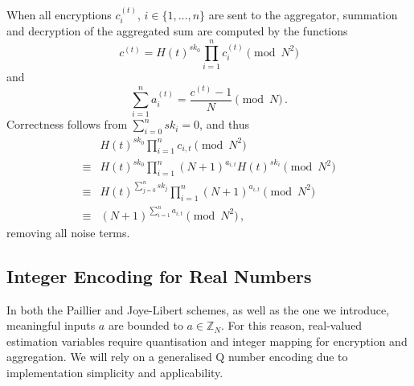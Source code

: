 \documentclass[10pt,letterpaper,oneside,twocolumn,journal]{IEEEtran}
\theoremstyle{definition}
\theoremstyle{definition}
\theoremstyle{remark}
\begin{document}
When all encryptions $c^{(t)}_{i},\,i\in\{1,\dots,n\}$ are sent to the aggregator, summation and decryption of the aggregated sum are computed by the functions
\begin{equation}
    c^{(t)} = H(t)^{sk_0}\prod^{n}_{i=1}c^{(t)}_{i} \pmod{N^2} \label{eqn:agg_summation}
\end{equation}
and
\begin{equation}
    \sum^{n}_{i=1}a^{(t)}_{i} = \frac{c^{(t)}-1}{N} \pmod{N}\,. \label{eqn:agg_decryption}
\end{equation}
Correctness follows from $\sum^{n}_{i=0}sk_i = 0$, and thus
\begin{equation*}
    \begin{split}
        &H(t)^{sk_0}\prod^{n}_{i=1}c_{i,t} \pmod{N^2} \\
        \equiv &H(t)^{sk_0}\prod^{n}_{i=1}(N+1)^{a_{i,t}} H(t)^{sk_i} \pmod{N^2} \\
        \equiv &H(t)^{\sum^n_{j=0}sk_j} \prod^{n}_{i=1}(N+1)^{a_{i,t}} \pmod{N^2} \\
        \equiv &(N+1)^{\sum^n_{i=1}a_{i,t}} \pmod{N^2}\,,
    \end{split}
\end{equation*}
removing all noise terms.

% 
% 

\subsection{Integer Encoding for Real Numbers} \label{subsec:encoding}
In both the Paillier and Joye-Libert schemes, as well as the one we introduce, meaningful inputs $a$ are bounded to $a \in \mathbb{Z}_N$. For this reason, real-valued estimation variables require quantisation and integer mapping for encryption and aggregation. We will rely on a generalised Q number encoding \cite{oberstarFixedPointRepresentationFractional2007} due to implementation simplicity and applicability.
\end{document}
